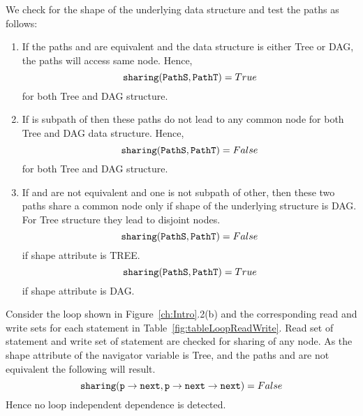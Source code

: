 We check for the shape of the underlying data structure 
and test the paths as follows:
\begin{enumerate}
\item If the paths  and  are equivalent and the data structure is either Tree or DAG, 
the paths will access same node. Hence,
\[ {\tt sharing (PathS, PathT)} = True\] for both Tree and DAG structure.
\item If  is subpath of  then these paths do not lead to any common node for both Tree 
and DAG data structure. Hence, 
\[ {\tt sharing (PathS, PathT)} = False\] for both Tree and DAG structure.
\item If  and  are not equivalent and one is not subpath of other, then these two paths share a common node only if 
shape of the underlying structure is DAG. For Tree structure they lead to disjoint nodes. 
\[ {\tt sharing (PathS, PathT)} = False\] if shape attribute is TREE.
\[ {\tt sharing (PathS, PathT)} = True\] if shape attribute is DAG.
\end{enumerate}
\begin{example}{\rm
Consider the loop shown in Figure~\ref{ch:Intro}.2(b) and the corresponding 
read and write sets for each statement in Table~\ref{fig:tableLoopReadWrite}. Read set of statement
 and write set of statement  are checked for sharing of any  node. As the shape attribute 
of the navigator variable  is Tree, and the paths  and 
 are not equivalent the following will result.
\[{\tt sharing(p\rightarrow{next}, p\rightarrow{next}\rightarrow{next})} = False\]
Hence no loop independent dependence is detected. 
}
\hfill\psframebox{}  \end{example}
